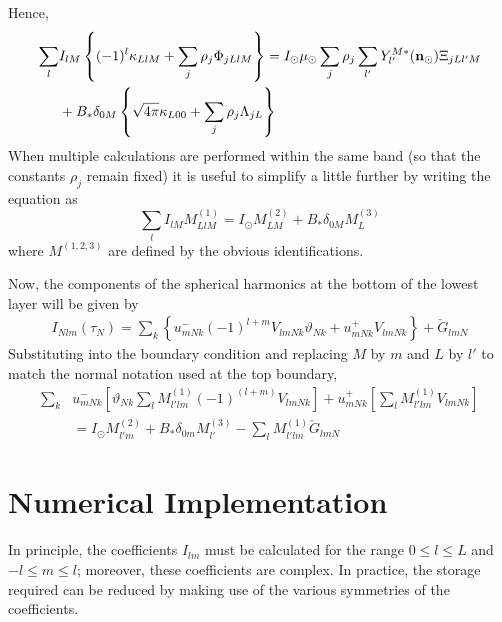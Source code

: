Hence,
\begin{equation}
\begin{split}
\sum_l & I_{lM} \left \{ (-1)^l \kappa_{LlM} + \sum_j \rho_j 
\Phi_{jLlM} \right \} 
= I_\odot \mu_\odot \sum_j \rho_j \sum_{l'} Y_{l'}^{M*} ( \mathbf{n}_\odot)
\Xi_{jLl'M} \\
&+ B_* \delta_{0M} \left \{ \sqrt{4\pi} \kappa_{L00} 
+ \sum_j \rho_j \Lambda_{jL}
\right \}
\end{split}
\end{equation}
When multiple calculations are performed within the same band (so that
the constants $\rho_j$ remain fixed) it is useful to simplify a little
further by writing the equation as
\begin{equation}
\sum_l I_{lM} M^{(1)}_{LlM} =I_\odot M^{(2)}_{LM} + B_* \delta_{0M} M^{(3)}_L
\end{equation}
where $M^{(1,2,3)}$ are defined by the obvious identifications.


Now, the components of the spherical harmonics at the bottom of the
lowest layer will be given by
\begin{equation}
\begin{split}
I_{Nlm}(\tau_N)= \sum_k \left \{ u_{mNk}^- (-1)^{l+m} V_{lmNk} 
\vartheta_{Nk} + u_{mNk}^+ V_{lmNk} \right \}
+\check G_{lmN} 
\end{split}
\end{equation}
Substituting into the boundary condition and replacing $M$ by $m$ and $L$ by
$l'$ to match the normal notation used at the top boundary,
{\small
\begin{equation}
\begin{split}
\sum_k & u_{mNk}^- \left [ \vartheta_{Nk} \sum_l M_{l'lm}^{(1)} 
(-1)^{(l+m)} V_{lmNk} 
\right ] + u_{mNk}^+ \left [ \sum_l M_{l'lm}^{(1)} 
V_{lmNk} \right ] \\
&= I_\odot M_{l'm}^{(2)} + B_* \delta_{0m} M_{l'}^{(3)} 
- \sum_l M_{l'lm}^{(1)} \check G_{lmN}
\end{split}
\end{equation}
}


\section{Numerical Implementation}

In principle, the coefficients $I_{lm}$ must be calculated for the range
$0\le l \le L$ and $-l \le m \le l$; moreover, these coefficients are complex.
In practice, the storage required can be reduced by making use of the
various symmetries of the coefficients.

